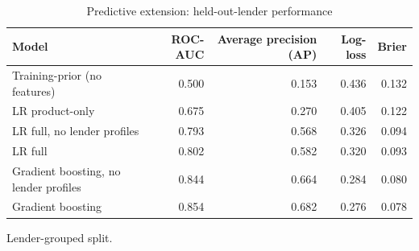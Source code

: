 \begin{table}[t]
\centering
\caption{Predictive extension: held-out-lender performance}
\label{tab:table8_predictive}
\small
\begin{tabular}{lrrrr}
\toprule
Model & ROC-AUC & Average precision (AP) & Log-loss & Brier \\
\midrule
Training-prior (no features) & 0.500 & 0.153 & 0.436 & 0.132 \\
LR product-only & 0.675 & 0.270 & 0.405 & 0.122 \\
LR full, no lender profiles & 0.793 & 0.568 & 0.326 & 0.094 \\
LR full & 0.802 & 0.582 & 0.320 & 0.093 \\
Gradient boosting, no lender profiles & 0.844 & 0.664 & 0.284 & 0.080 \\
Gradient boosting & 0.854 & 0.682 & 0.276 & 0.078 \\
\bottomrule
\end{tabular}
\par\footnotesize Lender-grouped split.
\end{table}
